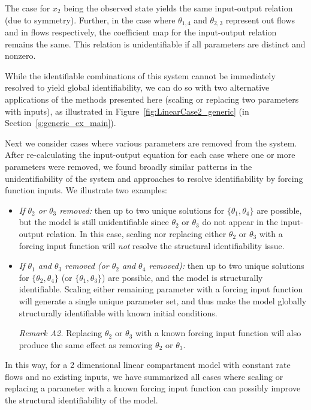 \documentclass[a4paper,fleqn]{cas-dc}
\theoremstyle{definition}
\begin{document}

The case for $x_2$ being the observed state yields the same input-output relation (due to symmetry).
Further, in the case where $\theta_{1,4}$ and $\theta_{2,3}$ represent out flows and in flows respectively, the coefficient map for the input-output relation remains the same.
This relation is unidentifiable if all parameters are distinct and nonzero.

While the identifiable combinations of this system cannot be immediately resolved to yield global identifiability, we can do so with two alternative applications of the methods presented here (scaling or replacing two parameters with inputs), as illustrated in Figure~\ref{fig:LinearCase2_generic} (in Section~\ref{s:generic_ex_main}).

Next we consider cases where various parameters are removed from the system. After re-calculating the input-output equation for each case where one or more parameters were removed, we found broadly similar patterns in the unidentifiability of the system and approaches to resolve identifiability by forcing function inputs. We illustrate two examples:
\begin{itemize} 
    \item \textit{If $\theta_2$ or $\theta_3$ removed:} then up to two unique solutions for $\{\theta_1, \theta_4\}$ are possible, but the model is still unidentifiable since $\theta_2$ or $\theta_3$ do not appear in the input-output relation. In this case, scaling nor replacing either $\theta_2$ or $\theta_3$ with a forcing input function will \textit{not} resolve the structural identifiability issue.
    
    \item \textit{If $\theta_1$ and $\theta_3$ removed (or $\theta_2$ and $\theta_4$ removed):} then up to two unique solutions for $\{\theta_2, \theta_4\}$ (or $\{\theta_1, \theta_3\}$) are possible, and the model is structurally identifiable. Scaling either remaining parameter with a forcing input function will generate a single unique parameter set, and thus make the model globally structurally identifiable with known initial conditions. 
    
    \noindent \textit{Remark A2. } 
        Replacing $\theta_2$ or $\theta_3$ with a known forcing input function will also produce the same effect as removing $\theta_2$ or $\theta_3$.
\end{itemize}
In this way, for a 2 dimensional linear compartment model with constant rate flows and no existing inputs, we have summarized all cases where scaling or replacing a parameter with a known forcing input function can possibly improve the structural identifiability of the model.
\end{document}
